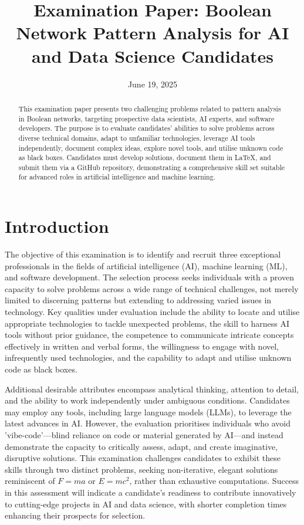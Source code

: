 \documentclass[12pt]{article}
\title{Examination Paper: Boolean Network Pattern Analysis for AI and Data Science Candidates}
\author{}
\date{June 19, 2025}
\begin{document}
\maketitle

\begin{abstract}
This examination paper presents two challenging problems related to pattern analysis in Boolean networks, targeting prospective data scientists, AI experts, and software developers. The purpose is to evaluate candidates' abilities to solve problems across diverse technical domains, adapt to unfamiliar technologies, leverage AI tools independently, document complex ideas, explore novel tools, and utilise unknown code as black boxes. Candidates must develop solutions, document them in LaTeX, and submit them via a GitHub repository, demonstrating a comprehensive skill set suitable for advanced roles in artificial intelligence and machine learning.
\end{abstract}

\section{Introduction}
The objective of this examination is to identify and recruit three exceptional professionals in the fields of artificial intelligence (AI), machine learning (ML), and software development. The selection process seeks individuals with a proven capacity to solve problems across a wide range of technical challenges, not merely limited to discerning patterns but extending to addressing varied issues in technology. Key qualities under evaluation include the ability to locate and utilise appropriate technologies to tackle unexpected problems, the skill to harness AI tools without prior guidance, the competence to communicate intricate concepts effectively in written and verbal forms, the willingness to engage with novel, infrequently used technologies, and the capability to adapt and utilise unknown code as black boxes.

Additional desirable attributes encompass analytical thinking, attention to detail, and the ability to work independently under ambiguous conditions. Candidates may employ any tools, including large language models (LLMs), to leverage the latest advances in AI. However, the evaluation prioritises individuals who avoid 'vibe-code'—blind reliance on code or material generated by AI—and instead demonstrate the capacity to critically assess, adapt, and create imaginative, disruptive solutions. This examination challenges candidates to exhibit these skills through two distinct problems, seeking non-iterative, elegant solutions reminiscent of \( F = ma \) or \( E = mc^2 \), rather than exhaustive computations. Success in this assessment will indicate a candidate's readiness to contribute innovatively to cutting-edge projects in AI and data science, with shorter completion times enhancing their prospects for selection.
\end{document}

